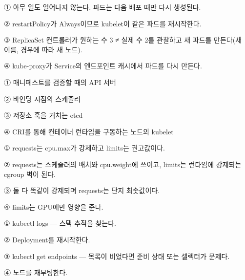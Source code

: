 \begin{tbboptions}
  \item ① 아무 일도 일어나지 않는다. 파드는 다음 배포 때만 다시 생성된다.
  \item ② restartPolicy가 Always이므로 kubelet이 같은 파드를 재시작한다.
  \item ③ ReplicaSet 컨트롤러가 원하는 수 3 ≠ 실제 수 2를 관찰하고 새 파드를 만든다(새 이름, 경우에 따라 새 노드).
  \item ④ kube-proxy가 Service의 엔드포인트 캐시에서 파드를 다시 만든다.
\end{tbboptions}


\begin{tbboptions}
  \item ① 매니페스트를 검증할 때의 API 서버
  \item ② 바인딩 시점의 스케줄러
  \item ③ 저장소 훅을 거치는 etcd
  \item ④ CRI를 통해 컨테이너 런타임을 구동하는 노드의 kubelet
\end{tbboptions}


\begin{tbboptions}
  \item ① requests는 cpu.max가 강제하고 limits는 권고값이다.
  \item ② requests는 스케줄러의 배치와 cpu.weight에 쓰이고, limits는 런타임에 강제되는 cgroup 벽이 된다.
  \item ③ 둘 다 똑같이 강제되며 requests는 단지 최솟값이다.
  \item ④ limits는 GPU에만 영향을 준다.
\end{tbboptions}


\begin{tbboptions}
  \item ① kubectl logs — 스택 추적을 찾는다.
  \item ② Deployment를 재시작한다.
  \item ③ kubectl get endpoints — 목록이 비었다면 준비 상태 또는 셀렉터가 문제다.
  \item ④ 노드를 재부팅한다.
\end{tbboptions}

